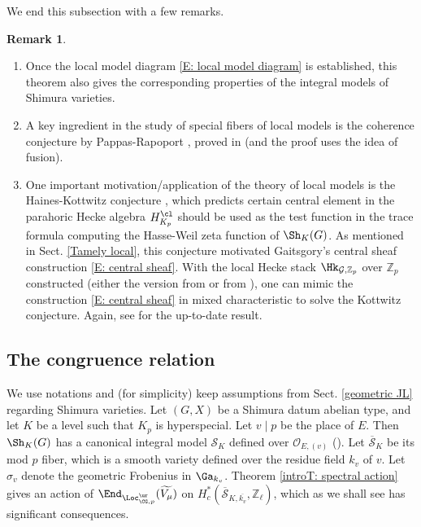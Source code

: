 \documentclass[11pt]{amsart}
\theoremstyle{definition}
\theoremstyle{definition}
\newtheorem{rmk}[thm]{Remark}
\theoremstyle{definition}
\numberwithin{equation}{section}
\newcommand{\bZ}{{\mathbb Z}}
\newcommand{\mG}{{\mathcal G}}
\newcommand{\mO}{{\mathcal O}}
\newcommand{\scrS}{{\mathscr S}}
\begin{document}
We end this subsection with a few remarks.
\begin{rmk}
\begin{enumerate}
\item Once the local model diagram \eqref{E: local model diagram} is established, this theorem also gives the corresponding properties of the integral models of Shimura varieties. 

\item A key ingredient in the study of special fibers of local models is the coherence conjecture by Pappas-Rapoport \cite{Pappas-Rapoport-Ramified-Unitary}, proved in \cite{Zhu-Coherence-Conjecture} (and the proof uses the idea of fusion).

\item 
One important motivation/application of the theory of local models is the Haines-Kottwitz conjecture \cite{Haines-Test-Function}, which predicts certain central element in the parahoric Hecke algebra $H_{K_p}^{\cl}$ should be used as the test function in the trace formula computing the Hasse-Weil zeta function of $\Sh_{K}(G)$. As mentioned in Sect. \ref{Tamely local}, this conjecture motivated 
Gaitsgory's central sheaf construction \eqref{E: central sheaf}. With the local Hecke stack $\Hk_{\mG,\bZ_p}$ over $\bZ_p$ constructed (either the version from \cite{Pappas-Zhu-Local-Model} or from \cite{Scholze-Berkeley}), one can mimic the construction \eqref{E: central sheaf} in mixed characteristic to solve the Kottwitz conjecture. Again, see \cite{AGLR} for the up-to-date result.
\end{enumerate}
\end{rmk} 

\subsection{The congruence relation}\label{S: Congruence}
We use notations and (for simplicity) keep assumptions from Sect. \ref{geometric JL} regarding Shimura varieties.
Let $(G,X)$ be a Shimura datum abelian type, and let $K$ be a level such that $K_p$ is hyperspecial. Let $v\mid p$ be the place of $E$. Then $\Sh_K(G)$ has a canonical integral model $\scrS_K$ defined over $\mO_{E,(v)}$ (\cite{Kisin-Integral-Model}).
Let $\overline{\scrS}_K$ be its mod $p$ fiber, which is a smooth variety defined over the residue field $k_v$ of $v$. Let $\sigma_v$ denote the geometric Frobenius in $\Ga_{k_v}$. Theorem \ref{introT: spectral action} gives an action of $\End_{\Loc_{\CG,p}^{\ur}}(\widetilde{V_\mu})$ on $H^*_c(\overline\scrS_{K,\overline{k_v}},\bZ_\ell)$, which as we shall see has significant consequences. 
\end{document}
